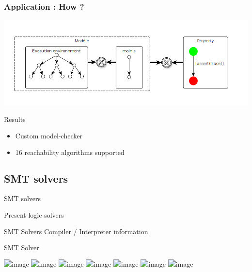 \documentclass{beamer}
\begin{document}
\begin{frame}
    \frametitle{Application : How ? }

    \includegraphics[width=\textwidth]{Figures/slide_mc.png}

    \begin{block}{Results}
        \begin{itemize}
            \item Custom model-checker
            \item 16 reachability algorithms supported
        \end{itemize}
    \end{block}

\end{frame}




\subsection{SMT solvers}

\begin{frame}{SMT solvers}

Present logic solvers

\end{frame}

\begin{frame}{SMT Solvers}
Compiler / Interpreter information
\end{frame}

\begin{frame}{SMT Solver}

\includegraphics<1>[width=9cm]{Figures/SMTsolver/1.png}
\includegraphics<2>[width=9cm]{Figures/SMTsolver/2.png}
\includegraphics<3>[width=9cm]{Figures/SMTsolver/3.png}
\includegraphics<4>[width=9cm]{Figures/SMTsolver/4.png}
\includegraphics<5>[width=9cm]{Figures/SMTsolver/5.png}
\includegraphics<6>[width=9cm]{Figures/SMTsolver/6.png}
\includegraphics<7>[width=9cm]{Figures/SMTsolver/7.png}

\end{frame}
\end{document}
